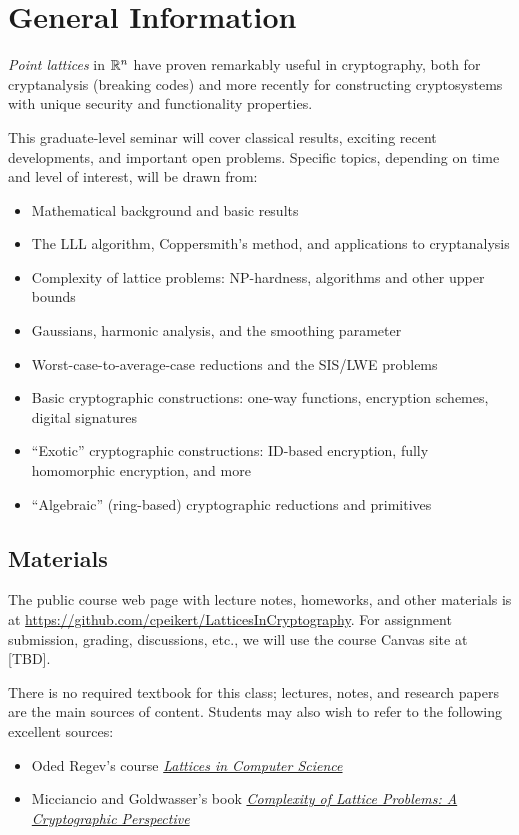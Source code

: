 \documentclass[11pt]{article}
\begin{document}
\thispagestyle{fancy}           %

\section{General Information}
\label{sec:general-information}

\emph{Point lattices} in $\mathbb{R}^{n}$ have proven remarkably useful in
cryptography, both for cryptanalysis (breaking codes) and more
recently for constructing cryptosystems with unique security and
functionality properties.

This graduate-level seminar will cover classical results, exciting
recent developments, and important open problems.  Specific topics,
depending on time and level of interest, will be drawn from:
\begin{itemize}[itemsep=0pt]
\item Mathematical background and basic results
\item The LLL algorithm, Coppersmith's method, and applications to
  cryptanalysis
\item Complexity of lattice problems: NP-hardness, algorithms and
  other upper bounds
\item Gaussians, harmonic analysis, and the smoothing parameter
\item Worst-case-to-average-case reductions and the SIS/LWE problems
\item Basic cryptographic constructions: one-way functions, encryption
  schemes, digital signatures
\item ``Exotic'' cryptographic constructions: ID-based encryption,
  fully homomorphic encryption, and more
\item ``Algebraic'' (ring-based) cryptographic reductions and
  primitives
\end{itemize}

\subsection{Materials}
\label{sec:materials}

The public course web page with lecture notes, homeworks, and other
materials is at {\small
  \url{https://github.com/cpeikert/LatticesInCryptography}}.  For
assignment submission, grading, discussions, etc., we will use the
course Canvas site at [TBD].

There is no required textbook for this class; lectures, notes, and
research papers are the main sources of content. Students may also
wish to refer to the following excellent sources:
\begin{itemize}
\item Oded Regev's course
  \href{http://www.cims.nyu.edu/~regev/teaching/lattices_fall_2009/index.html}{\emph{Lattices
      in Computer Science}}
\item Micciancio and Goldwasser's book
  \href{http://link.springer.com/book/10.1007/978-1-4615-0897-7/page/1}{\emph{Complexity
      of Lattice Problems: A Cryptographic Perspective}}
\end{itemize}
\end{document}
